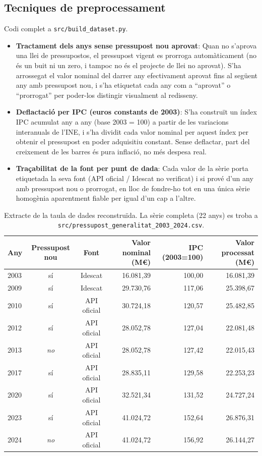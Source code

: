\documentclass[11pt,a4paper]{article}
\begin{document}
\subsection{Tecniques de preprocessament}
Codi complet a \texttt{src/build\_dataset.py}.
\begin{itemize}
  \item \textbf{Tractament dels anys sense pressupost nou aprovat}: Quan no s’aprova una llei de
pressupostos, el pressupost vigent es prorroga automàticament (no és un buit ni un zero, i tampoc
no és el projecte de llei no aprovat). S’ha arrossegat el valor nominal del darrer any efectivament
aprovat fins al següent any amb pressupost nou, i s’ha etiquetat cada any com a “aprovat” o
“prorrogat” per poder-los distingir visualment al redisseny.
  \item \textbf{Deflactació per IPC (euros constants de 2003)}: S’ha construït un índex IPC acumulat
any a any (base 2003 = 100) a partir de les variacions interanuals de l’INE, i s’ha dividit cada
valor nominal per aquest índex per obtenir el pressupost en poder adquisitiu constant. Sense
deflactar, part del creixement de les barres és pura inflació, no més despesa real.
  \item \textbf{Traçabilitat de la font per punt de dada}: Cada valor de la sèrie porta etiquetada la seva
font (API oficial / Idescat no verificat) i si prové d’un any amb pressupost nou o prorrogat, en
lloc de fondre-ho tot en una única sèrie homogènia aparentment fiable per igual d’un cap a l’altre.
\end{itemize}

\begin{table}[h!]
\centering \footnotesize
\begin{tabular}{lccrrr}
\toprule
Any & Pressupost nou & Font & Valor nominal (M€) & IPC (2003=100) & Valor processat (M€) \\
\midrule
2003 & sí & Idescat & 16.081,39 & 100,00 & 16.081,39 \\
2009 & sí & Idescat & 29.730,76 & 117,06 & 25.398,67 \\
2010 & sí & API oficial & 30.724,18 & 120,57 & 25.482,85 \\
2012 & sí & API oficial & 28.052,78 & 127,04 & 22.081,48 \\
2013 & \emph{no} & API oficial & 28.052,78 & 127,42 & 22.015,43 \\
2017 & sí & API oficial & 28.835,11 & 129,58 & 22.253,23 \\
2020 & sí & API oficial & 32.521,34 & 131,52 & 24.727,24 \\
2023 & sí & API oficial & 41.024,72 & 152,64 & 26.876,31 \\
2024 & \emph{no} & API oficial & 41.024,72 & 156,92 & 26.144,27 \\
\bottomrule
\end{tabular}
\caption{Extracte de la taula de dades reconstruïda. La sèrie completa (22 anys) es troba a \texttt{src/pressupost\_generalitat\_2003\_2024.csv}.}
\end{table}
\end{document}
